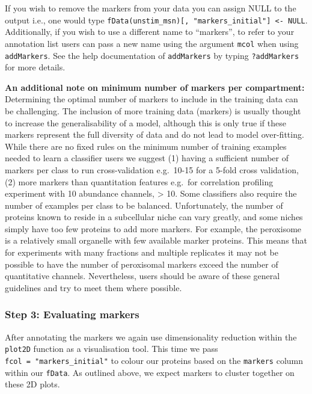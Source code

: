 \documentclass[9pt,a4paper,]{extarticle}
\begin{document}
If you wish to remove the markers from your data you can assign NULL to the
output i.e., one would type \texttt{fData(unstim\_msn){[},\ "markers\_initial"{]}\ \textless{}-\ NULL}.
Additionally, if you wish to use a different name to ``markers'', to refer to your
annotation list users can pass a new name using the argument \texttt{mcol} when using
\texttt{addMarkers}. See the help documentation of \texttt{addMarkers} by typing \texttt{?addMarkers}
for more details.

\textbf{An additional note on minimum number of markers per compartment:}
Determining the optimal number of markers to include in the training data can
be challenging. The inclusion of more training data (markers) is usually
thought to increase the generalisability of a model, although this is only true
if these markers represent the full diversity of data and do not lead to model
over-fitting. While there are no fixed rules on the minimum number of training
examples needed to learn a classifier users we suggest (1) having a sufficient
number of markers per class to run cross-validation e.g.~10-15 for a 5-fold cross
validation, (2) more markers than quantitation features e.g.~for correlation
profiling experiment with 10 abundance channels, \textgreater{} 10. Some classifiers also
require the number of examples per class to be balanced. Unfortunately, the number
of proteins known to reside in a subcellular niche can vary greatly, and some
niches simply have too few proteins to add more markers. For example, the
peroxisome is a relatively small organelle with few available marker proteins.
This means that for experiments with many fractions and multiple replicates it
may not be possible to have the number of peroxisomal markers exceed the number
of quantitative channels. Nevertheless, users should be aware of these general
guidelines and try to meet them where possible.

\subsubsection{Step 3: Evaluating markers}\label{step-3-evaluating-markers}

After annotating the markers we again use dimensionality reduction within the
\texttt{plot2D} function as a visualisation tool. This time we pass \texttt{fcol\ =\ "markers\_initial"}
to colour our proteins based on the \texttt{markers} column within our \texttt{fData}. As
outlined above, we expect markers to cluster together on these 2D plots.
\end{document}
